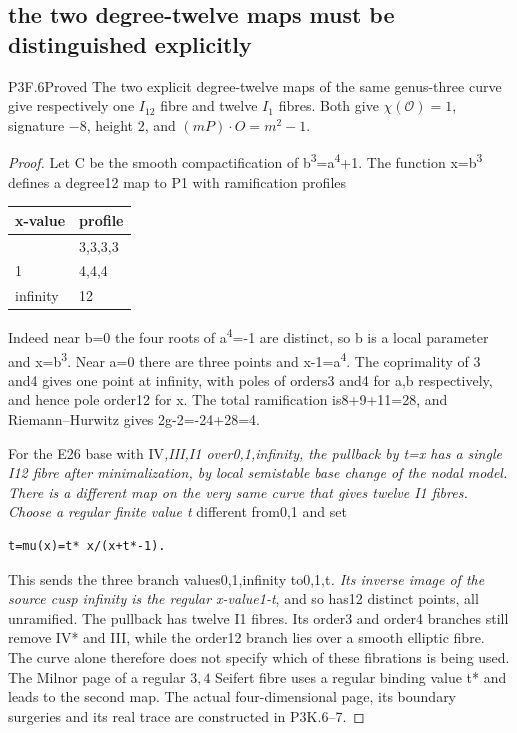 \subsection{the two degree-twelve maps must be distinguished explicitly}
\begin{statement}{P3F.6}{Proved}
The two explicit degree-twelve maps of the same genus-three curve give respectively one $I_{12}$ fibre and twelve $I_1$ fibres. Both give $\chi(\mathcal O)=1$, signature $-8$, height $2$, and $(mP)\cdot O=m^2-1$.
\end{statement}
\begin{proof}
Let C be the smooth compactification of b\textsuperscript{3}=a\textsuperscript{4}+1. The function x=b\textsuperscript{3} defines a degree12 map to P1 with ramification profiles

\begin{longtable}[]{@{}ll@{}}
\toprule\noalign{}
x-value & profile \\
\midrule\noalign{}
\endhead
\bottomrule\noalign{}
\endlastfoot
0 & 3,3,3,3 \\
1 & 4,4,4 \\
infinity & 12 \\
\end{longtable}

Indeed near b=0 the four roots of a\textsuperscript{4}=-1 are distinct, so b is a local parameter and x=b\textsuperscript{3}. Near a=0 there are three points and x-1=a\textsuperscript{4}. The coprimality of 3 and4 gives one point at infinity, with poles of orders3 and4 for a,b respectively, and hence pole order12 for x. The total ramification is8+9+11=28, and Riemann--Hurwitz gives 2g-2=-24+28=4.

For the E26 base with IV\emph{,III,I1 over0,1,infinity, the pullback by t=x has a single I12 fibre after minimalization, by local semistable base change of the nodal model. There is a different map on the very same curve that gives twelve I1 fibres. Choose a regular finite value t} different from0,1 and set

\begin{lstlisting}
t=mu(x)=t* x/(x+t*-1).
\end{lstlisting}

This sends the three branch values0,1,infinity to0,1,t\emph{. Its inverse image of the source cusp infinity is the regular x-value1-t}, and so has12 distinct points, all unramified. The pullback has twelve I1 fibres. Its order3 and order4 branches still remove IV* and III, while the order12 branch lies over a smooth elliptic fibre. The curve alone therefore does not specify which of these fibrations is being used. The Milnor page of a regular \(3,4\) Seifert fibre uses a regular binding value t* and leads to the second map. The actual four-dimensional page, its boundary surgeries and its real trace are constructed in P3K.6--7.


\end{proof}

